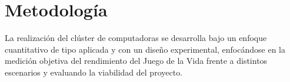 \section{Metodología}
\label{section:metodologia}

La realización del clúster de computadoras se desarrolla bajo un enfoque cuantitativo de tipo aplicada y con un diseño experimental, enfocándose en la medición objetiva del rendimiento del Juego de la Vida frente a distintos escenarios y evaluando la viabilidad del proyecto.